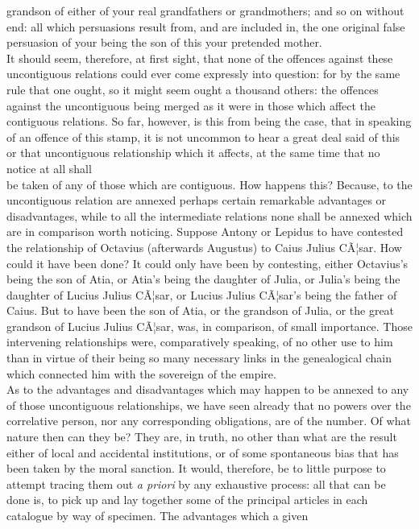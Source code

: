 \documentclass[12pt]{report}
\begin{document}
grandson of either of your real grandfathers or grandmothers; and so on
without end: all which persuasions result from, and are included in, the
one original false persuasion of your being the son of this your
pretended mother.\\
It should seem, therefore, at first sight, that none of the offences
against these uncontiguous relations could ever come expressly into
question: for by the same rule that one ought, so it might seem ought a
thousand others: the offences against the uncontiguous being merged as
it were in those which affect the contiguous relations. So far, however,
is this from being the case, that in speaking of an offence of this
stamp, it is not uncommon to hear a great deal said of this or that
uncontiguous relationship which it affects, at the same time that no
notice at all shall\\
be taken of any of those which are contiguous. How happens this?
Because, to the uncontiguous relation are annexed perhaps certain
remarkable advantages or disadvantages, while to all the intermediate
relations none shall be annexed which are in comparison worth noticing.
Suppose Antony or Lepidus to have contested the relationship of Octavius
(afterwards Augustus) to Caius Julius CÃ¦sar. How could it have been
done? It could only have been by contesting, either Octavius's being the
son of Atia, or Atia's being the daughter of Julia, or Julia's being the
daughter of Lucius Julius CÃ¦sar, or Lucius Julius CÃ¦sar's being the
father of Caius. But to have been the son of Atia, or the grandson of
Julia, or the great grandson of Lucius Julius CÃ¦sar, was, in
comparison, of small importance. Those intervening relationships were,
comparatively speaking, of no other use to him than in virtue of their
being so many necessary links in the genealogical chain which connected
him with the sovereign of the empire.\\
As to the advantages and disadvantages which may happen to be annexed to
any of those uncontiguous relationships, we have seen already that no
powers over the correlative person, nor any corresponding obligations,
are of the number. Of what nature then can they be? They are, in truth,
no other than what are the result either of local and accidental
institutions, or of some spontaneous bias that has been taken by the
moral sanction. It would, therefore, be to little purpose to attempt
tracing them out \emph{a priori} by any exhaustive process: all that can
be done is, to pick up and lay together some of the principal articles
in each catalogue by way of specimen. The advantages which a given
\end{document}
